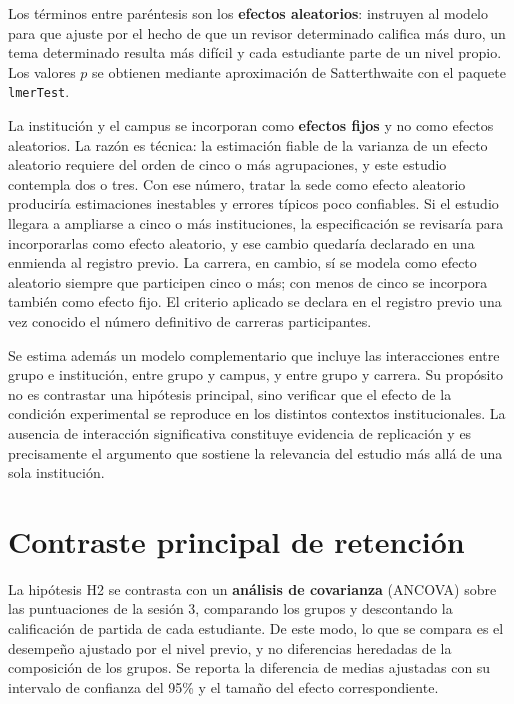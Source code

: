 \documentclass[12pt,a4paper,openany]{report}
\begin{document}
    Los t\'erminos entre par\'entesis son los \textbf{efectos aleatorios}: instruyen al modelo para que ajuste por el hecho de que un revisor determinado califica m\'as duro, un tema determinado resulta m\'as dif\'icil y cada estudiante parte de un nivel propio. Los valores $p$ se obtienen mediante aproximaci\'on de Satterthwaite con el paquete \texttt{lmerTest}.
    
    La instituci\'on y el campus se incorporan como \textbf{efectos fijos} y no como efectos aleatorios. La raz\'on es t\'ecnica: la estimaci\'on fiable de la varianza de un efecto aleatorio requiere del orden de cinco o m\'as agrupaciones, y este estudio contempla dos o tres. Con ese n\'umero, tratar la sede como efecto aleatorio producir\'ia estimaciones inestables y errores t\'ipicos poco confiables. Si el estudio llegara a ampliarse a cinco o m\'as instituciones, la especificaci\'on se revisar\'ia para incorporarlas como efecto aleatorio, y ese cambio quedar\'ia declarado en una enmienda al registro previo. La carrera, en cambio, s\'i se modela como efecto aleatorio siempre que participen cinco o m\'as; con menos de cinco se incorpora tambi\'en como efecto fijo. El criterio aplicado se declara en el registro previo una vez conocido el n\'umero definitivo de carreras participantes.
    
    Se estima adem\'as un modelo complementario que incluye las interacciones entre grupo e instituci\'on, entre grupo y campus, y entre grupo y carrera. Su prop\'osito no es contrastar una hip\'otesis principal, sino verificar que el efecto de la condici\'on experimental se reproduce en los distintos contextos institucionales. La ausencia de interacci\'on significativa constituye evidencia de replicaci\'on y es precisamente el argumento que sostiene la relevancia del estudio m\'as all\'a de una sola instituci\'on.
    
    \section{Contraste principal de retenci\'on}
    
    La hip\'otesis H2 se contrasta con un \textbf{an\'alisis de covarianza} (ANCOVA) sobre las puntuaciones de la sesi\'on 3, comparando los grupos y descontando la calificaci\'on de partida de cada estudiante. De este modo, lo que se compara es el desempe\~no ajustado por el nivel previo, y no diferencias heredadas de la composici\'on de los grupos. Se reporta la diferencia de medias ajustadas con su intervalo de confianza del 95\% y el tama\~no del efecto correspondiente.
    
\end{document}
